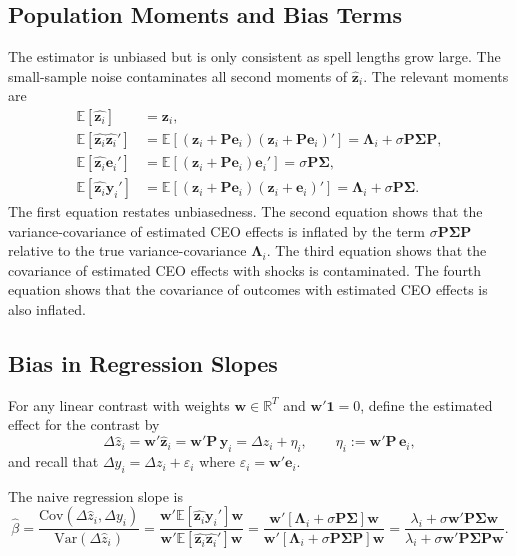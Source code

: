 \documentclass[11pt,a4paper]{article}
\newcommand{\Var}{\text{Var}}
\newcommand{\Cov}{\text{Cov}}
\begin{document}
\subsection{Population Moments and Bias Terms}

The estimator is unbiased but is only consistent as spell lengths grow large. The small-sample noise contaminates all second moments of $\hat{\mathbf z}_i$. The relevant moments are
\begin{align}
  \mathbb E[\hat{\mathbf z_i}] &= \mathbf z_i,\\
  \mathbb E[\hat{\mathbf z_i}\hat{\mathbf z_i}'] &= 
\mathbb E[(\mathbf z_i + \mathbf P\mathbf e_i)(\mathbf z_i + \mathbf P\mathbf e_i)' ] =
    \mathbf \Lambda_i + \sigma\mathbf P\mathbf\Sigma\mathbf P,\\ 
  \mathbb E[\hat{\mathbf z_i}\mathbf e_i'] &= 
\mathbb E[(\mathbf z_i + \mathbf P\mathbf e_i)\mathbf e_i' ] = \sigma\mathbf P\mathbf\Sigma,\\
  \mathbb E[\hat{\mathbf z_i}\mathbf y_i'] &= 
\mathbb E[(\mathbf z_i + \mathbf P\mathbf e_i)(\mathbf z_i + \mathbf e_i)' ] = \mathbf \Lambda_i + \sigma\mathbf P\mathbf\Sigma.
\end{align}
The first equation restates unbiasedness. The second equation shows that the variance-covariance of estimated CEO effects is inflated by the term $\sigma\mathbf P\mathbf\Sigma\mathbf P$ relative to the true variance-covariance $\mathbf \Lambda_i$. The third equation shows that the covariance of estimated CEO effects with shocks is contaminated. The fourth equation shows that the covariance of outcomes with estimated CEO effects is also inflated.

\subsection{Bias in Regression Slopes}

For any linear contrast with weights $\mathbf w\in\mathbb R^T$ and $\mathbf w'\mathbf 1=0$, define the estimated effect for the contrast by
$$
\Delta\hat z_i = \mathbf w'\hat{\mathbf z}_i = \mathbf w'\mathbf P\,\mathbf y_i = \Delta z_i + \eta_i,\qquad \eta_i:=\mathbf w'\mathbf P\,\mathbf e_i,
$$
and recall that $\Delta y_i = \Delta z_i + \varepsilon_i$ where $\varepsilon_i=\mathbf w'\mathbf e_i$. 

The naive regression slope is
\begin{equation}
\hat\beta = 
  \frac {\Cov(\Delta \hat z_i, \Delta y_i)}
        {\Var(\Delta \hat z_i)} =
  \frac {\mathbf w' \mathbb E[\hat{\mathbf z_i}\mathbf y_i ']\mathbf w}
        {\mathbf w' \mathbb E[\hat{\mathbf z_i}\hat{\mathbf z_i}']\mathbf w} =
  \frac {\mathbf w' [\mathbf \Lambda_i + \sigma \mathbf P\mathbf\Sigma]\mathbf w}
        {\mathbf w' [\mathbf \Lambda_i + \sigma \mathbf P\mathbf\Sigma\mathbf P]\mathbf w} =
  \frac {\lambda_i + \sigma \mathbf w' \mathbf P\mathbf\Sigma \mathbf w}
        {\lambda_i + \sigma \mathbf w' \mathbf P\mathbf\Sigma \mathbf P \mathbf w}. 
\end{equation}  
\end{document}
